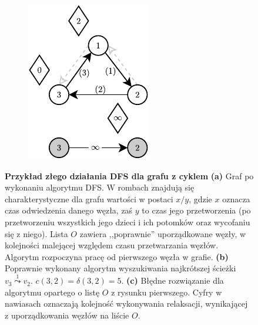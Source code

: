 \begin{figure}[!htbp]
\begin{subfigure}[b]{0.18\textwidth}
		\caption{}
	\end{subfigure}
	\qquad \qquad
	\begin{subfigure}[b]{0.18\textwidth}
		\includegraphics[width=\textwidth]{Chapter_II/BFS-TOPOLOGICAL-SORT-Example/c.pdf}
		\caption{}
	\end{subfigure}
	\caption{\textbf{Przykład złego działania \textsf{DFS} dla grafu z cyklem} \textbf{(a)} Graf po wykonaniu algorytmu \textsf{DFS}. W rombach znajdują się charakterystyczne dla grafu wartości w postaci $x/y$, gdzie $x$ oznacza czas odwiedzenia danego węzła, zaś $y$ to czas jego przetworzenia (po przetworzeniu wszystkich jego dzieci i ich potomków oraz wycofaniu się z niego). Lista $O$ zawiera ,,poprawnie'' uporządkowane węzły, w kolejności malejącej względem czasu przetwarzania węzłów. Algorytm rozpoczyna pracę od pierwszego węzła w grafie. \textbf{(b)} Poprawnie wykonany algorytm wyszukiwania najkrótszej ścieżki $v_{3} \overset{1} \leadsto v_{2}$. $c \left( 3, 2 \right) = \delta \left( 3, 2 \right) = 5$. \textbf{(c)} Błędne rozwiązanie dla algorytmu opartego o listę $O$ z rysunku pierwszego. Cyfry w nawiasach oznaczają kolejność wykonywania relaksacji, wynikającej z uporządkowania węzłów na liście $O$.} \label{fig:exampleDFS}
\end{figure}

